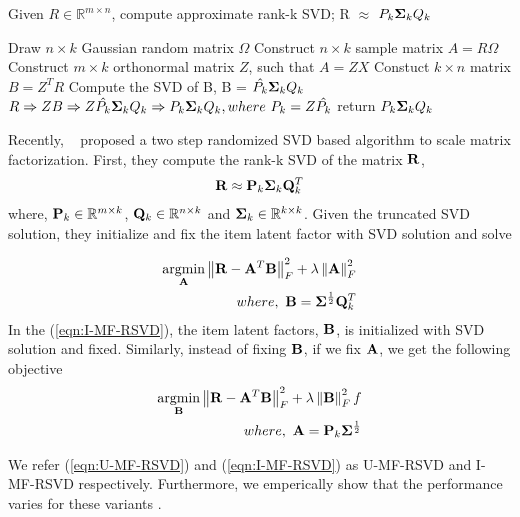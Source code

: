 \begin{algorithm}
  	\small
	\caption{Given $R \in \mathbb{R}^{m \times n}$, compute approximate rank-k SVD; R $\approx$ $P_k \Sig_k Q_k$}
	\label{algo:RSVD}
	\begin{algorithmic}[1]

	\State Draw $n\times k$ Gaussian random matrix $\Omega$
	\State Construct $n\times k$ sample matrix $A = R\Omega$
	\State Construct $m\times k$ orthonormal matrix $Z$, such that $A  = ZX$
	\State Constuct $k\times n$ matrix $B = Z^TR$
	\State Compute the SVD of B, B =  $\hat{P_k} \Sig_k Q_k$
	\State  $R \Rightarrow ZB \Rightarrow Z \hat{P_k} \Sig_k Q_k \Rightarrow  P_k \Sig_k Q_k, where\ P_k = Z \hat{P_k}$
	\State return $P_k \Sig_k Q_k$
	\EndProcedure
	\end{algorithmic}
\end{algorithm}


Recently, ~\citep{Tang:2013} proposed a two step randomized SVD based algorithm to scale matrix factorization. First, they compute the rank-k SVD of the matrix $\R$,
\begin{align*}
	\R \approx \P_k \Sig_k \Q^T_k
\end{align*}
where, $\P_k \in \mathbb{R}^{m \times k}$, $\Q_k \in \mathbb{R}^{n \times k}$ and $\Sig_k \in \mathbb{R}^{k \times k}$. Given the truncated SVD solution, they initialize and fix the item latent factor with SVD solution and solve 

\begin{align}
\label{eqn:I-MF-RSVD}
\begin{split}
\underset{\A}{\mathrm{argmin}}  \left \| \R - \A^T\B\right \|_F^2 + \lambda \left \|  \A \right \|_F^2   \\
where,\ \B = \Sig^{\frac{1}{2}} \Q^T_k 
\end{split}
\end{align}
In the (\ref{eqn:I-MF-RSVD}), the item latent factors, $\B$, is initialized with SVD solution and fixed. Similarly, instead of fixing $\B$, if we fix $\A$, we get the following objective  
\begin{align}
\label{eqn:U-MF-RSVD}
\begin{split}
\underset{\B}{\mathrm{argmin}}  \left \| \R - \A^T\B\right \|_F^2 + \lambda \left \|  \B \right \|_F^2 f\\
where,\ \A = \P_k \Sig^{\frac{1}{2}}\\
\end{split}
\end{align}

We refer (\ref{eqn:U-MF-RSVD}) and (\ref{eqn:I-MF-RSVD}) as U-MF-RSVD and I-MF-RSVD respectively. Furthermore, we emperically show that the performance varies for these variants .
